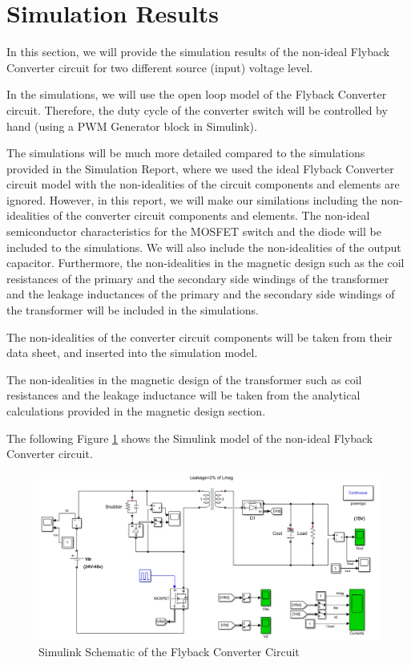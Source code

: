 \section{Simulation Results}

In this section, we will provide the simulation results of the non-ideal Flyback Converter circuit for two different source (input) voltage level.

In the simulations, we will use the open loop model of the Flyback Converter circuit. Therefore, the duty cycle of the converter switch will be controlled by hand (using a PWM Generator block in Simulink).

The simulations will be much more detailed compared to the simulations provided in the Simulation Report, where we used the ideal Flyback Converter circuit model with the non-idealities of the circuit components and elements are ignored. However, in this report, we will make our similations including the non-idealities of the converter circuit components and elements. The non-ideal semiconductor characteristics for the MOSFET switch and the diode will be included to the simulations. We will also include the non-idealities of the output capacitor. Furthermore, the non-idealities in the magnetic design such as the coil resistances of the primary and the secondary side windings of the transformer and the leakage inductances of the primary and the secondary side windings of the transformer will be included in the simulations.

The non-idealities of the converter circuit components will be taken from their data sheet, and inserted into the simulation model.

The non-idealities in the magnetic design of the transformer such as coil resistances and the leakage inductance will be taken from the analytical calculations provided in the magnetic design section.

The following Figure \ref{fig:fly_schema} shows the Simulink model of the non-ideal Flyback Converter circuit. 

\begin{figure}[H]
\begin{center}
\includegraphics[width=1\textwidth]{figures/flyback_schematic.png}
\caption{Simulink Schematic of the Flyback Converter Circuit}
\label{fig:fly_schema}
\end{center}
\end{figure}


